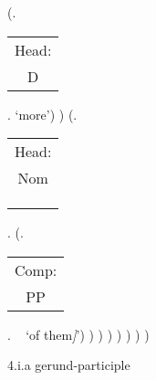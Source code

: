 \documentclass[12pt,letterpaper]{article}
\begin{document}
\begin{figure}
\begin{center}
\begin{parsetree}
			(.\begin{tabular}{c}Head:\\D\end{tabular}.  `more')
			)
			(.\begin{tabular}{c}Head:\\Nom\\\\\\\\\end{tabular}.
			(.\begin{tabular}{c}Comp:\\PP\end{tabular}. ~ `of them\emph{]}')
			)
			)
			)
			)
			)
			)
			)
			
		\end{parsetree}
		\hfill \break \hfill \break
		4.i.a gerund-participle
	\end{center}
\end{figure}
\end{document}
